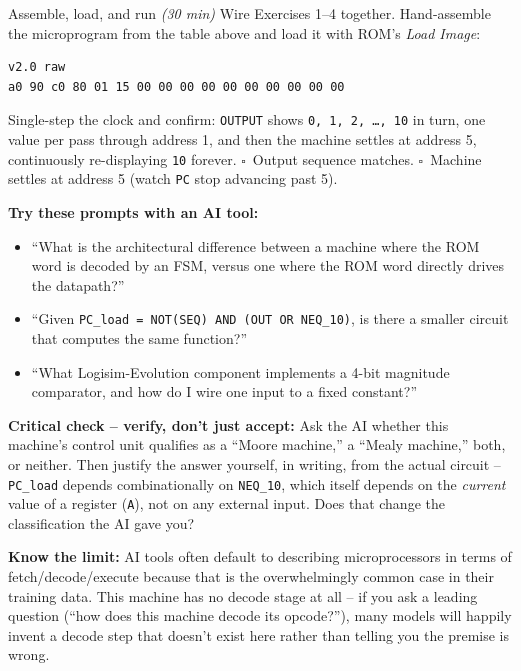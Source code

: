 \documentclass[11pt]{article}
\begin{document}
\begin{labexercise}{Assemble, load, and run \hfill {\small \itshape (30 min)}}
Wire Exercises 1--4 together. Hand-assemble the microprogram from the table above
and load it with ROM's \emph{Load Image}:
\begin{lstlisting}
v2.0 raw
a0 90 c0 80 01 15 00 00 00 00 00 00 00 00 00 00
\end{lstlisting}
Single-step the clock and confirm: \texttt{OUTPUT} shows \texttt{0, 1, 2,
\ldots, 10} in turn, one value per pass through address 1, and then the machine
settles at address 5, continuously re-displaying \texttt{10} forever.
$\square$~Output sequence matches. $\square$~Machine settles at address 5 (watch
\texttt{PC} stop advancing past 5).
\end{labexercise}

\begin{aicollab}
\textbf{Try these prompts with an AI tool:}
\begin{itemize}[leftmargin=*,nosep]
  \item ``What is the architectural difference between a machine where the ROM
        word is decoded by an FSM, versus one where the ROM word directly drives
        the datapath?''
  \item ``Given \texttt{PC\_load = NOT(SEQ) AND (OUT OR NEQ\_10)}, is there a
        smaller circuit that computes the same function?''
  \item ``What Logisim-Evolution component implements a 4-bit magnitude
        comparator, and how do I wire one input to a fixed constant?''
\end{itemize}

\medskip\textbf{Critical check -- verify, don't just accept:}
Ask the AI whether this machine's control unit qualifies as a ``Moore machine,''
a ``Mealy machine,'' both, or neither. Then justify the answer yourself, in
writing, from the actual circuit -- \texttt{PC\_load} depends combinationally on
\texttt{NEQ\_10}, which itself depends on the \emph{current} value of a register
(\texttt{A}), not on any external input. Does that change the classification the
AI gave you?

\medskip\textbf{Know the limit:}
AI tools often default to describing microprocessors in terms of
fetch/decode/execute because that is the overwhelmingly common case in their
training data. This machine has no decode stage at all -- if you ask a leading
question (``how does this machine decode its opcode?''), many models will
happily invent a decode step that doesn't exist here rather than telling you the
premise is wrong.
\end{aicollab}
\end{document}
